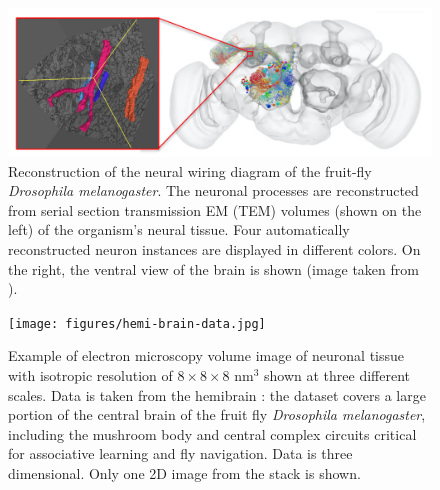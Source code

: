 \begin{figure}[t]
    \centering
    \includegraphics[width=0.95\linewidth]{figures/zoom-in-fruitfly.png}%
    \caption[Illustration of neuron reconstruction]{Reconstruction of the neural wiring diagram of the fruit-fly \emph{Drosophila melanogaster}. The neuronal processes are reconstructed from serial section transmission EM (TEM) volumes (shown on the left) of the organism's neural tissue. Four automatically reconstructed neuron instances are displayed in different colors. On the right, the ventral view of the brain is shown (image taken from \cite{zheng2018complete}).}
    \label{fig:zoom_in_fruitfly}
\end{figure}


\begin{figure}[tp]
    \centering
    \texttt{[image: figures/hemi-brain-data.jpg]}%
    \caption[Image of neuronal tissue at different scales]{Example of electron microscopy volume image of neuronal tissue with isotropic resolution of $8 \times 8 \times 8$ nm$^3$ shown at three different scales. Data is taken from the hemibrain \cite{Xu2020.01.21.911859}: the dataset covers a large portion of the central brain of the fruit fly \emph{Drosophila melanogaster}, including the mushroom body and central complex circuits critical for associative learning and fly navigation.  Data is three dimensional. Only one 2D image from the stack is shown.}
    \label{fig:neuron_segmentation_data}
\end{figure}


